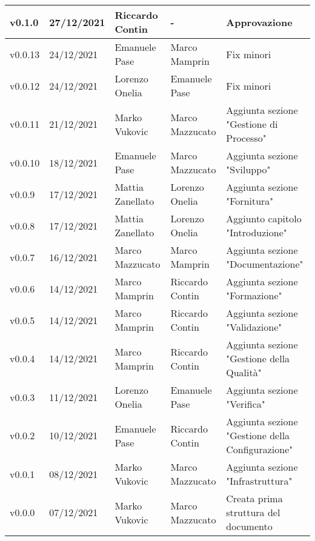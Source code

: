 {\begin{longtable}{|C{1.8cm}|C{2.1cm}|C{2cm}|C{2.4cm}|L{4.4cm}|}
  v0.1.0     & 27/12/2021    & Riccardo Contin  & -                     & Approvazione  \\ \hline
  v0.0.13    & 24/12/2021    & Emanuele Pase    & Marco Mamprin         & Fix minori  \\ \hline
  v0.0.12    & 24/12/2021    & Lorenzo Onelia   & Emanuele Pase         & Fix minori \\ \hline
  v0.0.11    & 21/12/2021    & Marko Vukovic    & Marco Mazzucato       & Aggiunta sezione "Gestione di Processo" \\ \hline
  v0.0.10    & 18/12/2021    & Emanuele Pase    & Marco Mazzucato       & Aggiunta sezione "Sviluppo" \\ \hline
  v0.0.9     & 17/12/2021    & Mattia Zanellato & Lorenzo Onelia        & Aggiunta sezione "Fornitura" \\ \hline
  v0.0.8     & 17/12/2021    & Mattia Zanellato & Lorenzo Onelia        & Aggiunto capitolo "Introduzione" \\ \hline
  v0.0.7     & 16/12/2021    & Marco Mazzucato  & Marco Mamprin         & Aggiunta sezione "Documentazione" \\ \hline
  v0.0.6     & 14/12/2021    & Marco Mamprin    & Riccardo Contin       & Aggiunta sezione "Formazione" \\ \hline
  v0.0.5     & 14/12/2021    & Marco Mamprin    & Riccardo Contin       & Aggiunta sezione "Validazione" \\ \hline
  v0.0.4     & 14/12/2021    & Marco Mamprin    & Riccardo Contin       & Aggiunta sezione "Gestione della Qualità" \\ \hline
  v0.0.3     & 11/12/2021    & Lorenzo Onelia   & Emanuele Pase         & Aggiunta sezione "Verifica" \\ \hline
  v0.0.2     & 10/12/2021    & Emanuele Pase    & Riccardo Contin       & Aggiunta sezione "Gestione della Configurazione" \\ \hline
  v0.0.1     & 08/12/2021    & Marko Vukovic    & Marco Mazzucato       & Aggiunta sezione "Infrastruttura" \\ \hline
  v0.0.0     & 07/12/2021    & Marko Vukovic    & Marco Mazzucato       & Creata prima struttura del documento \\ \hline
\end{longtable}}

\renewcommand\arraystretch{1}
